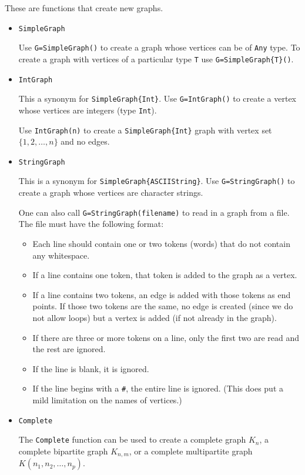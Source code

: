 \documentclass[oneside]{amsart}
\begin{document}
These are functions that create new graphs.

\begin{itemize}
\item \verb|SimpleGraph|

  Use \verb|G=SimpleGraph()| to create a graph whose vertices can be
  of \verb|Any| type. To create a graph with vertices of a particular
  type \verb|T| use \verb|G=SimpleGraph{T}()|.

\item \verb|IntGraph|

  This a synonym for \verb|SimpleGraph{Int}|. Use \verb|G=IntGraph()|
  to create a vertex whose vertices are integers (type \verb|Int|).

  Use \verb|IntGraph(n)| to create a \verb|SimpleGraph{Int}| graph
  with vertex set $\{1,2,\ldots,n\}$ and no edges.

\item \verb|StringGraph|

  This is a synonym for \verb|SimpleGraph{ASCIIString}|. Use
  \verb|G=StringGraph()| to create a graph whose vertices are
  character strings.

  One can also call \verb|G=StringGraph(filename)| to read in a graph
  from a file. The file must have the following format:
  \begin{itemize}
  \item Each line should contain one or two tokens (words) that do not
    contain any whitespace.
  \item If a line contains one token, that token is added to the graph
    as a vertex.
  \item If a line contains two tokens, an edge is added with those
    tokens as end points. If those two tokens are the same, no edge is
    created (since we do not allow loops) but a vertex is added (if
    not already in the graph).
  \item If there are three or more tokens on a line, only the first
    two are read and the rest are ignored.
  \item If the line is blank, it is ignored.
  \item If the line begins with a \verb|#|, the entire line is
    ignored. (This does put a mild limitation on the names of
    vertices.)
  \end{itemize}

  \item \verb|Complete|

    The \verb|Complete| function can be used to create a complete
    graph $K_n$, a complete bipartite graph $K_{n,m}$, or a complete
    multipartite graph $K(n_1,n_2,\ldots,n_p)$.


\end{itemize}
\end{document}
